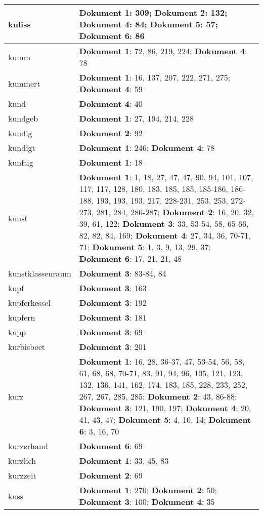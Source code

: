 \documentclass[a5paper]{article}
\begin{document}
\begin{longtable}[l]{|l|p{3in}|}
\hline
kuliss & \textbf{Dokument 1}: 309; \textbf{Dokument 2}: 132; \textbf{Dokument 4}: 84; \textbf{Dokument 5}: 57; \textbf{Dokument 6}: 86 \\
\hline
kumm & \textbf{Dokument 1}: 72, 86, 219, 224; \textbf{Dokument 4}: 78 \\
\hline
kummert & \textbf{Dokument 1}: 16, 137, 207, 222, 271, 275; \textbf{Dokument 4}: 59 \\
\hline
kund & \textbf{Dokument 4}: 40 \\
\hline
kundgeb & \textbf{Dokument 1}: 27, 194, 214, 228 \\
\hline
kundig & \textbf{Dokument 2}: 92 \\
\hline
kundigt & \textbf{Dokument 1}: 246; \textbf{Dokument 4}: 78 \\
\hline
kunftig & \textbf{Dokument 1}: 18 \\
\hline
kunst & \textbf{Dokument 1}: 1, 18, 27, 47, 47, 90, 94, 101, 107, 117, 117, 128, 180, 183, 185, 185, 185-186, 186-188, 193, 193, 193, 217, 228-231, 253, 253, 272-273, 281, 284, 286-287; \textbf{Dokument 2}: 16, 20, 32, 39, 61, 122; \textbf{Dokument 3}: 33, 53-54, 58, 65-66, 82, 82, 84, 169; \textbf{Dokument 4}: 27, 34, 36, 70-71, 71; \textbf{Dokument 5}: 1, 3, 9, 13, 29, 37; \textbf{Dokument 6}: 17, 21, 21, 48 \\
\hline
kunstklassenraum & \textbf{Dokument 3}: 83-84, 84 \\
\hline
kupf & \textbf{Dokument 3}: 163 \\
\hline
kupferkessel & \textbf{Dokument 3}: 192 \\
\hline
kupfern & \textbf{Dokument 3}: 181 \\
\hline
kupp & \textbf{Dokument 3}: 69 \\
\hline
kurbisbeet & \textbf{Dokument 3}: 201 \\
\hline
kurz & \textbf{Dokument 1}: 16, 28, 36-37, 47, 53-54, 56, 58, 61, 68, 68, 70-71, 83, 91, 94, 96, 105, 121, 123, 132, 136, 141, 162, 174, 183, 185, 228, 233, 252, 267, 267, 285, 285; \textbf{Dokument 2}: 43, 86-88; \textbf{Dokument 3}: 121, 190, 197; \textbf{Dokument 4}: 20, 41, 43, 47; \textbf{Dokument 5}: 4, 10, 14; \textbf{Dokument 6}: 3, 16, 70 \\
\hline
kurzerhand & \textbf{Dokument 6}: 69 \\
\hline
kurzlich & \textbf{Dokument 1}: 33, 45, 83 \\
\hline
kurzzeit & \textbf{Dokument 2}: 69 \\
\hline
kuss & \textbf{Dokument 1}: 270; \textbf{Dokument 2}: 50; \textbf{Dokument 3}: 100; \textbf{Dokument 4}: 35 \\

\end{longtable}
\end{document}

